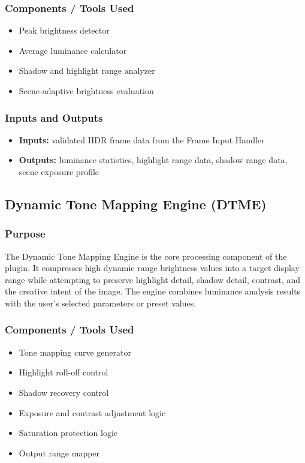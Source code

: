 \documentclass{article}
\begin{document}
\subsubsection*{Components / Tools Used}
\begin{itemize}
    \item Peak brightness detector
    \item Average luminance calculator
    \item Shadow and highlight range analyzer
    \item Scene-adaptive brightness evaluation
\end{itemize}

\subsubsection*{Inputs and Outputs}
\begin{itemize}
    \item \textbf{Inputs:} validated HDR frame data from the Frame Input Handler
    \item \textbf{Outputs:} luminance statistics, highlight range data, shadow range data, scene exposure profile
\end{itemize}


\subsection{Dynamic Tone Mapping Engine (DTME)}

\subsubsection*{Purpose}
The Dynamic Tone Mapping Engine is the core processing component of the plugin. It compresses high dynamic range brightness values into a target display range while attempting to preserve highlight detail, shadow detail, contrast, and the creative intent of the image. The engine combines luminance analysis results with the user's selected parameters or preset values.

\subsubsection*{Components / Tools Used}
\begin{itemize}
    \item Tone mapping curve generator
    \item Highlight roll-off control
    \item Shadow recovery control
    \item Exposure and contrast adjustment logic
    \item Saturation protection logic
    \item Output range mapper
\end{itemize}
\end{document}
